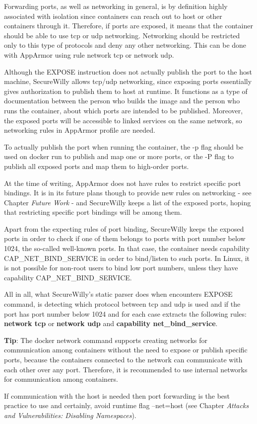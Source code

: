 Forwarding ports, as well as networking in general, is by definition highly associated with isolation since containers can reach out to host or other containers through it. Therefore, if ports are exposed, it means that the container should be able to use tcp or udp networking. Networking should be restricted only to this type of protocols and deny any other networking. This can be done with AppArmor using rule network tcp or network udp.

Although the EXPOSE instruction does not actually publish the port to the host machine, SecureWilly allows tcp/udp networking, since exposing ports essentially gives authorization to publish them to host at runtime. It functions as a type of documentation between the person who builds the image and the person who runs the container, about which ports are intended to be published. Moreover, the exposed ports will be accessible to linked services on the same network, so networking rules in AppArmor profile are needed.

To actually publish the port when running the container, the -p flag should be used on docker run to publish and map one or more ports, or the -P flag to publish all exposed ports and map them to high-order ports.

At the time of writing, AppArmor does not have rules to restrict specific port bindings. It is in its future plans though to provide new rules on networking - see Chapter \textit{Future Work} - and SecureWilly keeps a list of the exposed ports, hoping that restricting specific port bindings will be among them. 

Apart from the expecting rules of port binding, SecureWilly keeps the exposed ports in order to check if one of them belongs to ports with port number below 1024, the so-called well-known ports. In that case, the container needs capability CAP\_NET\_BIND\_SERVICE in order to bind/listen to such ports. In Linux, it is not possible for non-root users to bind low port numbers, unless they have capability CAP\_NET\_BIND\_SERVICE.

All in all, what SecureWilly's static parser does when encounters EXPOSE command, is detecting which protocol between tcp and udp is used and if the port has port number below 1024 and for each case extracts the following rules: \textbf{network tcp} or \textbf{network udp} and \textbf{capability net\_bind\_service}.

\begin{mdframed}[backgroundcolor=tipcolor]
\textbf{Tip}: The docker network command supports creating networks for communication among containers without the need to expose or publish specific ports, because the containers connected to the network can communicate with each other over any port. Therefore, it is recommended to use internal networks for communication among containers.

If communication with the host is needed then port forwarding is the best practice to use and certainly, avoid runtime flag --net=host (see Chapter \textit{Attacks and Vulnerabilities: Disabling Namespaces}).
\end{mdframed}

